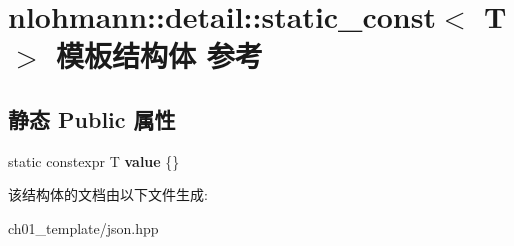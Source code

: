 \hypertarget{structnlohmann_1_1detail_1_1static__const}{}\section{nlohmann\+::detail\+::static\+\_\+const$<$ T $>$ 模板结构体 参考}
\label{structnlohmann_1_1detail_1_1static__const}
\subsection*{静态 Public 属性}
\begin{DoxyCompactItemize}
\item 
\mbox{\label{structnlohmann_1_1detail_1_1static__const_a6bb7ab2ddd6abc41fb4ffb7c6dfa237e}} 
static constexpr T {\bfseries value} \{\}
\end{DoxyCompactItemize}


该结构体的文档由以下文件生成\+:\begin{DoxyCompactItemize}
\item 
ch01\+\_\+template/json.\+hpp\end{DoxyCompactItemize}
